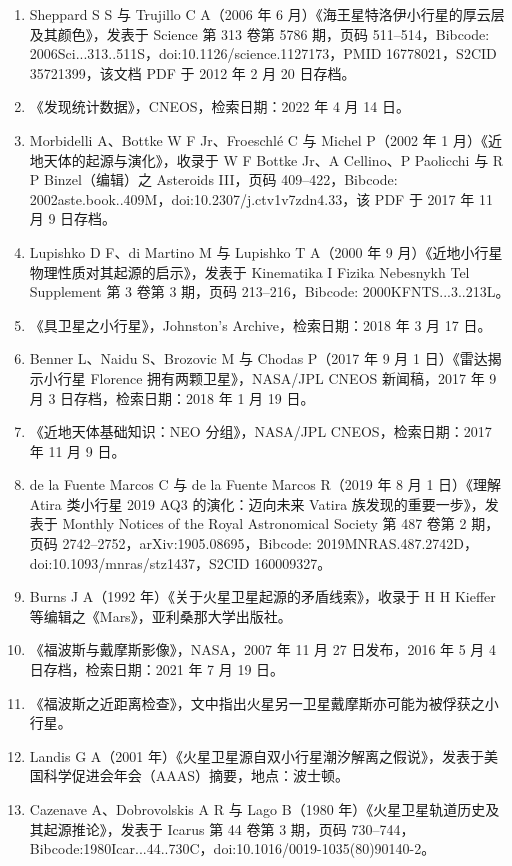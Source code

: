 \begin{enumerate}
\item Sheppard S S 与 Trujillo C A（2006 年 6 月）《海王星特洛伊小行星的厚云层及其颜色》，发表于 Science 第 313 卷第 5786 期，页码 511–514，Bibcode: 2006Sci...313..511S，doi:10.1126/science.1127173，PMID 16778021，S2CID 35721399，该文档 PDF 于 2012 年 2 月 20 日存档。
\item 《发现统计数据》，CNEOS，检索日期：2022 年 4 月 14 日。
\item Morbidelli A、Bottke W F Jr、Froeschlé C 与 Michel P（2002 年 1 月）《近地天体的起源与演化》，收录于 W F Bottke Jr、A Cellino、P Paolicchi 与 R P Binzel（编辑）之 Asteroids III，页码 409–422，Bibcode: 2002aste.book..409M，doi:10.2307/j.ctv1v7zdn4.33，该 PDF 于 2017 年 11 月 9 日存档。
\item Lupishko D F、di Martino M 与 Lupishko T A（2000 年 9 月）《近地小行星物理性质对其起源的启示》，发表于 Kinematika I Fizika Nebesnykh Tel Supplement 第 3 卷第 3 期，页码 213–216，Bibcode: 2000KFNTS...3..213L。
\item 《具卫星之小行星》，Johnston’s Archive，检索日期：2018 年 3 月 17 日。
\item Benner L、Naidu S、Brozovic M 与 Chodas P（2017 年 9 月 1 日）《雷达揭示小行星 Florence 拥有两颗卫星》，NASA/JPL CNEOS 新闻稿，2017 年 9 月 3 日存档，检索日期：2018 年 1 月 19 日。
\item 《近地天体基础知识：NEO 分组》，NASA/JPL CNEOS，检索日期：2017 年 11 月 9 日。
\item de la Fuente Marcos C 与 de la Fuente Marcos R（2019 年 8 月 1 日）《理解 Atira 类小行星 2019 AQ3 的演化：迈向未来 Vatira 族发现的重要一步》，发表于 Monthly Notices of the Royal Astronomical Society 第 487 卷第 2 期，页码 2742–2752，arXiv:1905.08695，Bibcode: 2019MNRAS.487.2742D，doi:10.1093/mnras/stz1437，S2CID 160009327。
\item Burns J A（1992 年）《关于火星卫星起源的矛盾线索》，收录于 H H Kieffer 等编辑之《Mars》，亚利桑那大学出版社。
\item 《福波斯与戴摩斯影像》，NASA，2007 年 11 月 27 日发布，2016 年 5 月 4 日存档，检索日期：2021 年 7 月 19 日。
\item 《福波斯之近距离检查》，文中指出火星另一卫星戴摩斯亦可能为被俘获之小行星。
\item Landis G A（2001 年）《火星卫星源自双小行星潮汐解离之假说》，发表于美国科学促进会年会（AAAS）摘要，地点：波士顿。
\item Cazenave A、Dobrovolskis A R 与 Lago B（1980 年）《火星卫星轨道历史及其起源推论》，发表于 Icarus 第 44 卷第 3 期，页码 730–744，Bibcode:1980Icar...44..730C，doi:10.1016/0019-1035(80)90140-2。

\end{enumerate}
